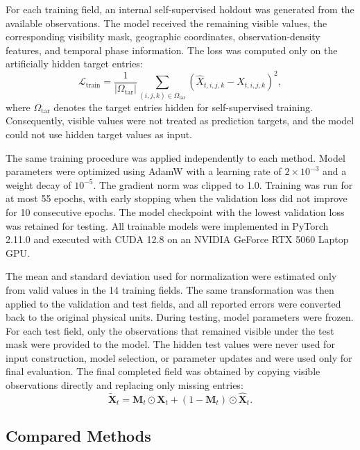 \documentclass[conference]{IEEEtran}
\begin{document}
For each training field, an internal self-supervised holdout was generated from
the available observations. The model received the remaining visible values,
the corresponding visibility mask, geographic coordinates, observation-density
features, and temporal phase information. The loss was computed only on the
artificially hidden target entries:
\begin{equation}
\mathcal{L}_{\mathrm{train}}
=
\frac{1}{|\Omega_{\mathrm{tar}}|}
\sum_{(i,j,k)\in\Omega_{\mathrm{tar}}}
\left(
\widehat{X}_{t,i,j,k}-X_{t,i,j,k}
\right)^2,
\label{eq:training-loss}
\end{equation}
where $\Omega_{\mathrm{tar}}$ denotes the target entries hidden for
self-supervised training. Consequently, visible values were not treated as
prediction targets, and the model could not use hidden target values as input.

The same training procedure was applied independently to each method. Model
parameters were optimized using AdamW with a learning rate of
$2\times 10^{-3}$ and a weight decay of $10^{-5}$. The gradient norm was clipped
to 1.0. Training was run for at most 55 epochs, with early stopping when the
validation loss did not improve for 10 consecutive epochs. The model checkpoint
with the lowest validation loss was retained for testing. All trainable models
were implemented in PyTorch 2.11.0 and executed with CUDA 12.8 on an NVIDIA
GeForce RTX 5060 Laptop GPU.

The mean and standard deviation used for normalization were estimated only from
valid values in the 14 training fields. The same transformation was then
applied to the validation and test fields, and all reported errors were
converted back to the original physical units. During testing, model parameters
were frozen. For each test field, only the observations that remained visible
under the test mask were provided to the model. The hidden test values were
never used for input construction, model selection, or parameter updates and
were used only for final evaluation. The final completed field was obtained by
copying visible observations directly and replacing only missing entries:
\begin{equation}
\widetilde{\mathbf{X}}_t
=
\mathbf{M}_t\odot\mathbf{X}_t
+
\left(1-\mathbf{M}_t\right)\odot
\widehat{\mathbf{X}}_t.
\label{eq:observed-copy-test}
\end{equation}

\subsection{Compared Methods}
\end{document}
